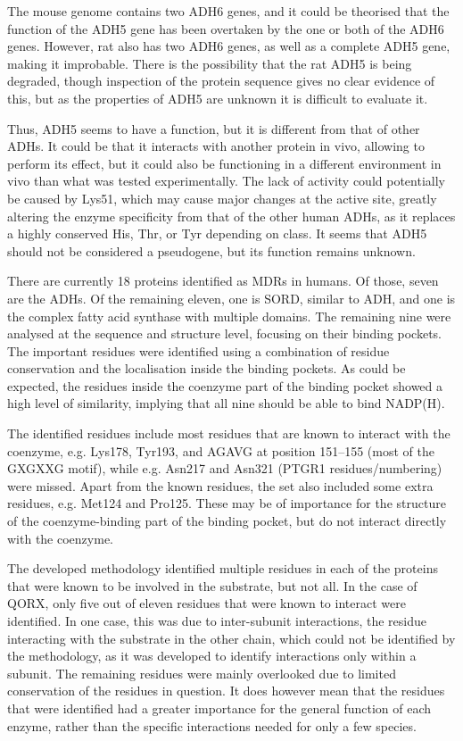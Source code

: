 \documentclass[a4paper, twoside, 12pt, openright]{report}
\begin{document}
The mouse genome contains two ADH6 genes, and it could be theorised that the function of the ADH5 gene has been overtaken by the one or both of the ADH6 genes. However, rat also has two ADH6 genes, as well as a complete ADH5 gene, making it improbable. There is the possibility that the rat ADH5 is being degraded, though inspection of the protein sequence gives no clear evidence of this, but as the properties of ADH5 are unknown	 it is difficult to evaluate it.

Thus, ADH5 seems to have a function, but it is different from that of other ADHs. It could be that it interacts with another protein in vivo, allowing to perform its effect, but it could also be functioning in a different environment in vivo than what was tested experimentally. The lack of activity could potentially be caused by Lys51, which may cause major changes at the active site, greatly altering the enzyme specificity from that of the other human ADHs, as it replaces a highly conserved His, Thr, or Tyr depending on class\cite{hoog_mammalian_2001-1}. It seems that ADH5 should not be considered a pseudogene, but its function remains unknown.

There are currently 18 proteins identified as MDRs in humans. Of those, seven are the ADHs. Of the remaining eleven, one is SORD, similar to ADH, and one is the complex fatty acid synthase with multiple domains. The remaining nine were analysed at the sequence and structure level, focusing on their binding pockets. The important residues were identified using a combination of residue conservation and the localisation inside the binding pockets. As could be expected, the residues inside the coenzyme part of the binding pocket showed a high level of similarity, implying that all nine should be able to bind NADP(H)\cite{wu_structural_2008}.

The identified residues include most residues that are known to interact with the coenzyme, e.g. Lys178, Tyr193, and AGAVG at position 151--155 (most of the GXGXXG motif\cite{wierenga_prediction_1986}), while e.g. Asn217 and Asn321 (PTGR1 residues/numbering) were missed. Apart from the known residues, the set also included some extra residues, e.g. Met124 and Pro125. These may be of importance for the structure of the coenzyme-binding part of the binding pocket, but do not interact directly with the coenzyme.

The developed methodology identified multiple residues in each of the proteins that were known to be involved in the substrate, but not all. In the case of QORX, only five out of eleven residues that were known to interact\cite{porte_three-dimensional_2009} were identified. In one case, this was due to inter-subunit interactions, the residue interacting with the substrate in the other chain, which could not be identified by the methodology, as it was developed to identify interactions only within a subunit. The remaining residues were mainly overlooked due to limited conservation of the residues in question. It does however mean that the residues that were identified had a greater importance for the general function of each enzyme, rather than the specific interactions needed for only a few species.
\end{document}
